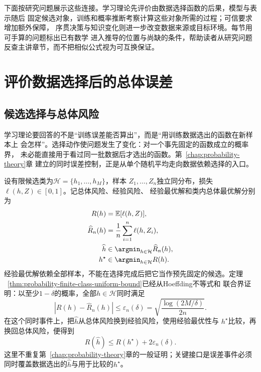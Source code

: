 下面按研究问题展示这些连接。学习理论先评价由数据选择函数的后果，模型与表示随后
固定候选对象，训练和概率推断考察计算这些对象所需的过程；可信要求增加额外保障，
序贯决策与知识变化则进一步改变数据来源或目标环境。每节用可手算的问题标出已有数学
进入推导的位置与尚缺的条件，帮助读者从研究问题反查主讲章节，而不把相似公式视为可互换保证。

\section{评价数据选择后的总体误差}
\label{sec:future-learning-theory-generalization}

\subsection{候选选择与总体风险}
\label{sec:future-selection-population-risk}

学习理论要回答的不是“训练误差能否算出”，而是“用训练数据选出的函数在新样本上
会怎样”。选择动作使问题发生了变化：对一个事先固定的函数成立的概率界，
未必能直接用于看过同一批数据后才选出的函数。第~\ref{chap:probability-theory}章
建立的同时误差控制，正是从单个随机平均走向数据依赖选择的入口。

设有限候选类为$\mathcal{H}=\{h_1,\ldots,h_M\}$，样本
$Z_1,\ldots,Z_n$独立同分布，损失$\ell(h,Z)\in[0,1]$。记总体风险、经验风险、
经验最优解和类内总体最优解分别为
\begin{align*}
  R(h)&=\mathbb{E}[\ell(h,Z)],\\
  \widehat{R}_n(h)
  &=
  \frac{1}{n}\sum_{i=1}^{n}\ell(h,Z_i),\\
  \widehat{h}
  &\in
  \argmin_{h\in\mathcal{H}}\widehat{R}_n(h),\\
  h^\star
  &\in
  \argmin_{h\in\mathcal{H}}R(h).
\end{align*}
经验最优解依赖全部样本，不能在选择完成后把它当作预先固定的候选。定理
~\ref{thm:probability-finite-class-uniform-bound}已经从Hoeffding不等式和
联合界证明：以至少$1-\delta$的概率，全部$h\in\mathcal H$同时满足
\[
  |R(h)-\widehat R_n(h)|
  \leq
  \varepsilon_n(\delta)
  =
  \sqrt{\frac{\log(2M/\delta)}{2n}}.
\]
在这个同时事件上，把$\widehat h$从总体风险换到经验风险，使用经验最优性与
$h^\star$比较，再换回总体风险，便得到
\begin{equation}
  R(\widehat{h})
  \leq
  R(h^\star)+2\varepsilon_n(\delta).
  \label{eq:future-erm-risk-bound}
\end{equation}
这里不重复第~\ref{chap:probability-theory}章的一般证明；关键接口是误差事件必须
同时覆盖数据选出的$\widehat h$与用于比较的$h^\star$。

